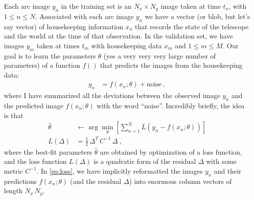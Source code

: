 \documentclass[modern]{aastex631}
\begin{document}
Each arc image $y_n$ in the training set is an $N_x\times N_y$ image taken at time $t_n$, with $1\leq n\leq N$.
Associated with each arc image $y_n$ we have a vector (or blob, but let's say vector) of housekeeping information $x_n$ that records the state of the telescope and the world at the time of that observation.
In the validation set, we have images $y_m$ taken at times $t_m$ with housekeeping data $x_m$ and $1\leq m\leq M$.
Our goal is to learn the parameters $\theta$ (yes a very very very large number of parameters) of a function $f()$ that predicts the images from the housekeeping data:
\begin{align}
    y_n &= f(x_n; \theta) + \text{noise}
    ~,
\end{align}
where I have summarized all the deviations between the observed image $y_n$ and the predicted image $f(x_n;\theta)$ with the word ``noise''.
Incredibly briefly, the idea is that
\begin{align}\label{eq:loss}
    \hat{\theta} &\leftarrow \arg\min_\theta\left[\sum_{n=1}^N L\!\left(y_n - f(x_n;\theta)\right)\right]
    \\
    L\!\left(\Delta\right) &= \frac{1}{2}\,\Delta^T\,C^{-1}\,\Delta
    ~,
\end{align}
where the best-fit parameters $\hat{\theta}$ are obtained by optimization of a loss function,
and the loss function $L(\Delta)$ is a quadratic form of the residual $\Delta$ with some metric $C^{-1}$.
In \eqref{eq:loss}, we have implicitly reformatted the images $y_n$ and their predictions $f(x_n;\theta)$ (and the residual $\Delta$) into enormous column vectors of length $N_x\,N_y$.
\end{document}

